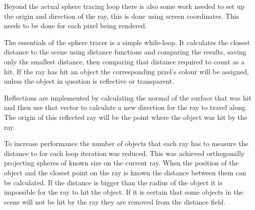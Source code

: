 			Beyond the actual sphere tracing loop there is also some work 
			needed to set up the origin and direction of the ray, this is done using 
			screen coordinates. This needs to be done for each pixel being 
			rendered.

			The essentials of the sphere tracer is a simple while-loop. It 
			calculates the closest distance to the scene using distance functions 
			and comparing the results, saving only the smallest distance, then 
			comparing that distance required to count as a hit. If the ray has hit 
			an object the corresponding pixel's colour will be assigned, unless the 
			object in question is reflective or transparent. 

			Reflections are implemented by calculating the normal of the surface 
			that was hit and then use that vector to calculate a new direction 
			for the ray to travel along. The origin of this reflected ray will be 
			the point where the object was hit by the ray.

			To increase performance the number of objects that each ray has to 
			measure the distance to for each loop iteration was reduced. This 
			was achieved orthogonally projecting spheres of known size on the
			current ray. When the position of the object and the closest point 
			on the ray is known the distance between them can be calculated. If
			the distance is bigger than the radius of the object it is impossible
			for the ray to hit the object. If it is certain that some objects in 
			the scene will not be hit by the ray they are removed from the 
			distance field.


			

	
		\subsection{}

